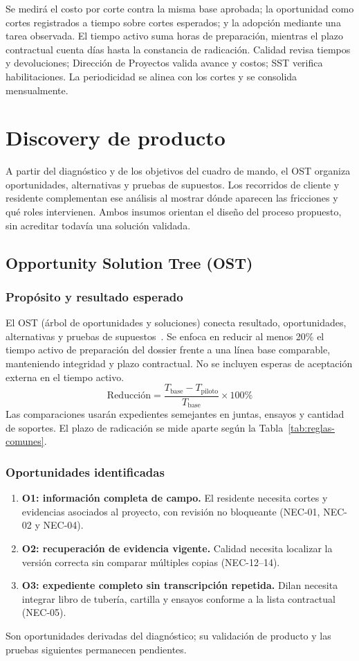 \documentclass[12pt,letterpaper]{article}
\begin{document}
Se medirá el costo por corte contra la misma base aprobada; la oportunidad como cortes registrados a tiempo sobre cortes esperados; y la adopción mediante una tarea observada. El tiempo activo suma horas de preparación, mientras el plazo contractual cuenta días hasta la constancia de radicación. Calidad revisa tiempos y devoluciones; Dirección de Proyectos valida avance y costos; SST verifica habilitaciones. La periodicidad se alinea con los cortes y se consolida mensualmente.


\FloatBarrier
\section{Discovery de producto}
A partir del diagnóstico y de los objetivos del cuadro de mando, el OST organiza oportunidades, alternativas y pruebas de supuestos. Los recorridos de cliente y residente complementan ese análisis al mostrar dónde aparecen las fricciones y qué roles intervienen. Ambos insumos orientan el diseño del proceso propuesto, sin acreditar todavía una solución validada.

\subsection{Opportunity Solution Tree (OST)}
\label{sec:ost}

\subsubsection{Propósito y resultado esperado}
El OST (árbol de oportunidades y soluciones) conecta resultado, oportunidades, alternativas y pruebas de supuestos~\cite{torres-ost}. Se enfoca en reducir al menos 20\% el tiempo activo de preparación del dossier frente a una línea base comparable, manteniendo integridad y plazo contractual. No se incluyen esperas de aceptación externa en el tiempo activo.
\[
\text{Reducción}=\frac{T_{\mathrm{base}}-T_{\mathrm{piloto}}}{T_{\mathrm{base}}}\times100\%
\]
Las comparaciones usarán expedientes semejantes en juntas, ensayos y cantidad de soportes. El plazo de radicación se mide aparte según la Tabla~\ref{tab:reglas-comunes}.

\subsubsection{Oportunidades identificadas}
\begin{enumerate}
\item \textbf{O1: información completa de campo.} El residente necesita cortes y evidencias asociados al proyecto, con revisión no bloqueante (NEC-01, NEC-02 y NEC-04).
\item \textbf{O2: recuperación de evidencia vigente.} Calidad necesita localizar la versión correcta sin comparar múltiples copias (NEC-12--14).
\item \textbf{O3: expediente completo sin transcripción repetida.} Dilan necesita integrar libro de tubería, cartilla y ensayos conforme a la lista contractual (NEC-05).
\end{enumerate}
Son oportunidades derivadas del diagnóstico; su validación de producto y las pruebas siguientes permanecen pendientes.
\end{document}
